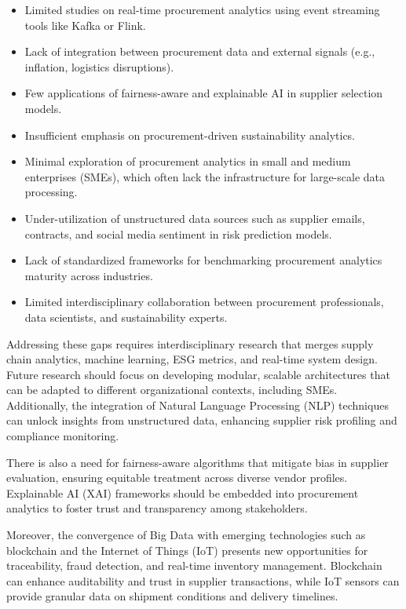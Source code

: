 \documentclass[10pt, twocolumn]{article}
\begin{document}
\begin{itemize} 
\item Limited studies on real-time procurement analytics using event streaming tools like Kafka or Flink. \item Lack of integration between procurement data and external signals (e.g., inflation, logistics disruptions). 
\item Few applications of fairness-aware and explainable AI in supplier selection models.
\item Insufficient emphasis on procurement-driven sustainability analytics. 
\item Minimal exploration of procurement analytics in small and medium enterprises (SMEs), which often lack the infrastructure for large-scale data processing. 
\item Under-utilization of unstructured data sources such as supplier emails, contracts, and social media sentiment in risk prediction models.
\item Lack of standardized frameworks for benchmarking procurement analytics maturity across industries. \item Limited interdisciplinary collaboration between procurement professionals, data scientists, and sustainability experts. 
\end{itemize}

Addressing these gaps requires interdisciplinary research that merges supply chain analytics, machine learning, ESG metrics, and real-time system design. Future research should focus on developing modular, scalable architectures that can be adapted to different organizational contexts, including SMEs. Additionally, the integration of Natural Language Processing (NLP) techniques can unlock insights from unstructured data, enhancing supplier risk profiling and compliance monitoring.

There is also a need for fairness-aware algorithms that mitigate bias in supplier evaluation, ensuring equitable treatment across diverse vendor profiles. Explainable AI (XAI) frameworks should be embedded into procurement analytics to foster trust and transparency among stakeholders.

Moreover, the convergence of Big Data with emerging technologies such as blockchain and the Internet of Things (IoT) presents new opportunities for traceability, fraud detection, and real-time inventory management. Blockchain can enhance auditability and trust in supplier transactions, while IoT sensors can provide granular data on shipment conditions and delivery timelines.
\end{document}
